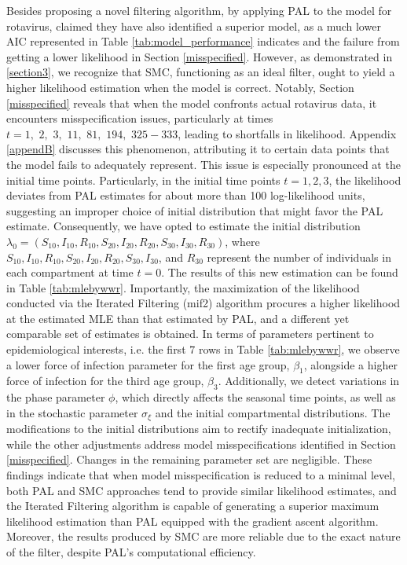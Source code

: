 \documentclass[10pt]{article}
\begin{document}
Besides proposing a novel filtering algorithm, by applying PAL to the model for rotavirus, \cite{wwr} claimed they have also identified a superior model, as a much lower AIC represented in Table \ref{tab:model_performance} indicates and the failure from getting a lower likelihood in Section \ref{misspecified}. However, as demonstrated in \ref{section3}, we recognize that SMC, functioning as an ideal filter, ought to yield a higher likelihood estimation when the model is correct. Notably, Section \ref{misspecified} reveals that when the model confronts actual rotavirus data, it encounters misspecification issues, particularly at times $t=1, \,\,2, \,\,3, \,\,11, \,\,81, \,\,194, \,\,325-333$, leading to shortfalls in likelihood. Appendix \ref{appendB} discusses this phenomenon, attributing it to certain data points that the model fails to adequately represent. This issue is especially pronounced at the initial time points. Particularly, in the initial time points $t=1,2,3$, the likelihood deviates from PAL estimates for about more than 100 log-likelihood units, suggesting an improper choice of initial distribution that might favor the PAL estimate. Consequently, we have opted to estimate the initial distribution \(\lambda_0 = (S_{10}, I_{10}, R_{10}, S_{20}, I_{20}, R_{20}, S_{30}, I_{30}, R_{30})\), where $S_{10}, I_{10}, R_{10}, S_{20}, I_{20}, R_{20}, S_{30}, I_{30}$, and $R_{30}$ represent the number of individuals in each compartment at time $t=0$. The results of this new estimation can be found in Table \ref{tab:mlebywwr}. Importantly, the maximization of the likelihood conducted via the Iterated Filtering (mif2) algorithm \citep{pomppackagepaper} procures a higher likelihood at the estimated MLE than that estimated by PAL, and a different yet comparable set of estimates is obtained. In terms of parameters pertinent to epidemiological interests, i.e. the first 7 rows in Table \ref{tab:mlebywwr}, we observe a lower force of infection parameter for the first age group, $\beta_1$, alongside a higher force of infection for the third age group, $\beta_3$. Additionally, we detect variations in the phase parameter $\phi$, which directly affects the seasonal time points, as well as in the stochastic parameter $\sigma_{\xi}$ and the initial compartmental distributions. The modifications to the initial distributions aim to rectify inadequate initialization, while the other adjustments address model misspecifications identified in Section \ref{misspecified}. Changes in the remaining parameter set are negligible. These findings indicate that when model misspecification is reduced to a minimal level, both PAL and SMC approaches tend to provide similar likelihood estimates, and the Iterated Filtering algorithm is capable of generating a superior maximum likelihood estimation than PAL equipped with the gradient ascent algorithm. Moreover, the results produced by SMC are more reliable due to the exact nature of the filter, despite PAL's computational efficiency.
\end{document}
